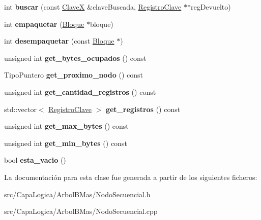 \begin{DoxyCompactItemize}
\item 
\hypertarget{class_nodo_secuencial_a42c03f4d034f1fac90721a8d7a3df00f}{int {\bfseries buscar} (const \hyperlink{class_clave_x}{\-Clave\-X} \&clave\-Buscada, \hyperlink{class_registro_clave}{\-Registro\-Clave} $\ast$$\ast$reg\-Devuelto)}\label{class_nodo_secuencial_a42c03f4d034f1fac90721a8d7a3df00f}

\item 
\hypertarget{class_nodo_secuencial_a9d4b616f7554f635dcf7c970a84e3fd1}{int {\bfseries empaquetar} (\hyperlink{class_bloque}{\-Bloque} $\ast$bloque)}\label{class_nodo_secuencial_a9d4b616f7554f635dcf7c970a84e3fd1}

\item 
\hypertarget{class_nodo_secuencial_ac80948f325e919cf63ea6f79688588f9}{int {\bfseries desempaquetar} (const \hyperlink{class_bloque}{\-Bloque} $\ast$)}\label{class_nodo_secuencial_ac80948f325e919cf63ea6f79688588f9}

\item 
\hypertarget{class_nodo_secuencial_adb445ede87af35c0bc3a97700adb19ff}{unsigned int {\bfseries get\-\_\-bytes\-\_\-ocupados} () const }\label{class_nodo_secuencial_adb445ede87af35c0bc3a97700adb19ff}

\item 
\hypertarget{class_nodo_secuencial_a89585ec8f7277785c813e93435b19c59}{\-Tipo\-Puntero {\bfseries get\-\_\-proximo\-\_\-nodo} () const }\label{class_nodo_secuencial_a89585ec8f7277785c813e93435b19c59}

\item 
\hypertarget{class_nodo_secuencial_af95a29354cb5a18b0d73bbce811d5c66}{unsigned int {\bfseries get\-\_\-cantidad\-\_\-registros} () const }\label{class_nodo_secuencial_af95a29354cb5a18b0d73bbce811d5c66}

\item 
\hypertarget{class_nodo_secuencial_ab8bb3f25a064354b6b55db06e0e2ca62}{std\-::vector$<$ \hyperlink{class_registro_clave}{\-Registro\-Clave} $>$ {\bfseries get\-\_\-registros} () const }\label{class_nodo_secuencial_ab8bb3f25a064354b6b55db06e0e2ca62}

\item 
\hypertarget{class_nodo_secuencial_a303fc4a9326f28f33f1e4982b02c4424}{unsigned int {\bfseries get\-\_\-max\-\_\-bytes} () const }\label{class_nodo_secuencial_a303fc4a9326f28f33f1e4982b02c4424}

\item 
\hypertarget{class_nodo_secuencial_a33e63419a1b5e96a37ddb20371c80b4a}{unsigned int {\bfseries get\-\_\-min\-\_\-bytes} () const }\label{class_nodo_secuencial_a33e63419a1b5e96a37ddb20371c80b4a}

\item 
\hypertarget{class_nodo_secuencial_a62c4e6b6e5e28052bf519263ce0de3bf}{bool {\bfseries esta\-\_\-vacio} ()}\label{class_nodo_secuencial_a62c4e6b6e5e28052bf519263ce0de3bf}

\end{DoxyCompactItemize}


\-La documentación para esta clase fue generada a partir de los siguientes ficheros\-:\begin{DoxyCompactItemize}
\item 
src/\-Capa\-Logica/\-Arbol\-B\-Mas/\-Nodo\-Secuencial.\-h\item 
src/\-Capa\-Logica/\-Arbol\-B\-Mas/\-Nodo\-Secuencial.\-cpp\end{DoxyCompactItemize}
